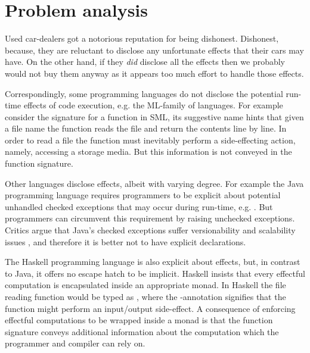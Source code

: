 \section{Problem analysis}
Used car-dealers got a notorious reputation for being dishonest. Dishonest, because, they are reluctant to disclose any unfortunate effects that their cars may have. On the other hand, if they \emph{did} disclose all the effects then we probably would not buy them anyway as it appears too much effort to handle those effects.

Correspondingly, some programming languages do not disclose the potential run-time effects of code execution, e.g. the ML-family of languages. For example consider the signature  for a function in SML, its suggestive name hints that given a file name the function reads the file and return the contents line by line. In order to read a file the function must inevitably perform a side-effecting action, namely, accessing a storage media. But this information is not conveyed in the function signature.

Other languages disclose effects, albeit with varying degree. For example the Java programming language requires programmers to be explicit about potential unhandled checked exceptions that may occur during run-time, e.g. . But programmers can circumvent this requirement by raising unchecked exceptions. Critics argue that Java's checked exceptions suffer versionability and scalability issues \cite{Venners03}, and therefore it is better not to have explicit  declarations.

The Haskell programming language is also explicit about effects, but, in contrast to Java, it offers no escape hatch to be implicit. Haskell insists that every effectful computation is encapsulated inside an appropriate monad. In Haskell the file reading function would be typed as , where the -annotation signifies that the function might perform an input/output side-effect. A consequence of enforcing effectful computations to be wrapped inside a monad is that the function signature conveys additional information about the computation which the programmer and compiler can rely on. 

